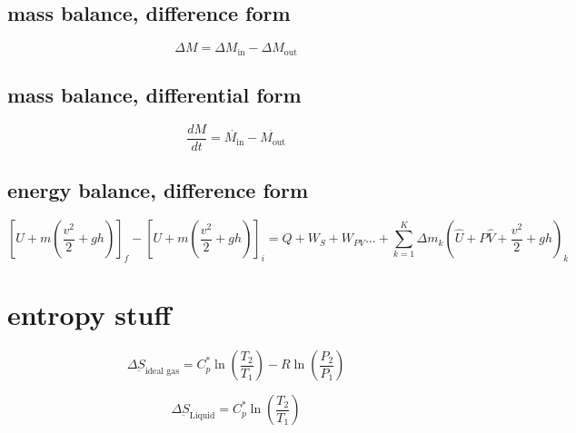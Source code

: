 \documentclass{article}
\begin{document}
\subsection*{mass balance, difference form}

\[
    \Delta M = \Delta M_{\text{in}} - \Delta M_{\text{out}}
\]

\subsection*{mass balance, differential form}

\[
    \frac{dM}{dt} = \dot{M_{\text{in}}} - \dot{M_{\text{out}}}
\]

\subsection*{energy balance, difference form}

\[
    \left[ U + m \left( \frac{v^2}{2} + gh \right) \right]_f - \left[ U + m \left( \frac{v^2}{2} + gh \right) \right]_i = Q + W_S + W_{PV} \ldots + \sum_{k=1}^{K} \Delta m_k \left( \hat{U} + P\hat{V} + \frac{v^2}{2} + gh \right)_k
\]





\section*{entropy stuff}

\[
    \Delta \underbar{S}_{\text{ideal gas}} = C_p^* \ln \left( \frac{T_2}{T_1} \right) - R \ln \left( \frac{P_2}{P_1} \right)
\]

\[
    \Delta \underbar{S}_{\text{Liquid}} = C_p^* \ln \left( \frac{T_2}{T_1} \right) 
\]
\end{document}
